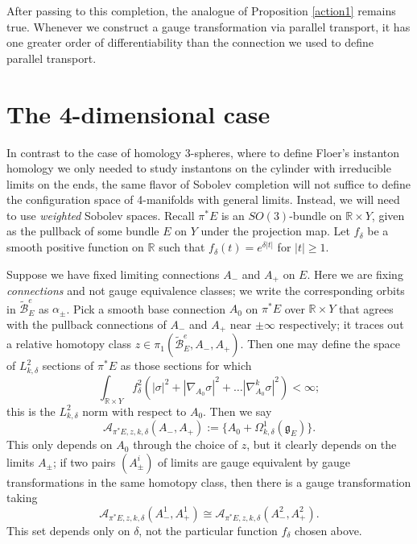 \documentclass[10pt,a4paper]{amsart}
\newcommand{\pE}{\pi^* \! E}
\theoremstyle{definition}
\theoremstyle{remark}
\numberwithin{figure}{qchap}
\begin{document}
After passing to this completion, the analogue of Proposition \ref{action1} remains true. Whenever we construct a gauge transformation via parallel transport, it has one greater order of differentiability than the connection we used to define parallel transport.

\section{The 4-dimensional case}\label{sec:config-Hilbert-4d}
In contrast to the case of homology 3-spheres, where to define Floer's instanton homology we only needed to study instantons on the cylinder with irreducible limits on the ends, the same flavor of Sobolev completion will not suffice to define the configuration space of 4-manifolds with general limits. Instead, we will need to use \textit{weighted} Sobolev spaces. Recall $\pE$ is an $SO(3)$-bundle on $\mathbb R \times Y$, given as the pullback of some bundle $E$ on $Y$ under the projection map. Let $f_\delta$ be a smooth positive function on $\mathbb R$ such that $f_\delta(t) = e^{\delta|t|}$ for $|t| \geq 1$. 

Suppose we have fixed limiting connections $A_-$ and $A_+$ on $E$. Here we are fixing \emph{connections} and not gauge equivalence classes; we write the corresponding orbits in $\widetilde{\mathcal B}^e_E$ as $\alpha_\pm$. Pick a smooth base connection $A_0$ on $\pE$ over $\mathbb R \times Y$ that agrees with the pullback connections of $A_-$ and $A_+$ near $\pm \infty$ respectively; it traces out a relative homotopy class $z \in \pi_1(\widetilde{\mathcal B}^e_E, A_-, A_+)$. Then one may define the space of $L^2_{k,\delta}$ sections of $\pE$ as those sections for which 
$$\int_{\mathbb R \times Y} f_\delta^2\left(|\sigma|^2 + |\nabla_{A_0}\sigma|^2 + \dots |\nabla_{A_0}^k \sigma|^2\right) < \infty;$$ 
this is the $L^2_{k,\delta}$ norm with respect to $A_0$. Then we say $$\mathcal A_{\pE,z,k,\delta}(A_-, A_+) := \{A_0 + \Omega^1_{k,\delta}(\mathfrak g_E)\}.$$ This only depends on $A_0$ through the choice of $z$, but it clearly depends on the limits $A_\pm$; if two pairs $(A_\pm^i)$ of limits are gauge equivalent by gauge transformations in the same homotopy class, then there is a gauge transformation taking 
$$\mathcal A_{\pE,z,k,\delta}(A^1_-, A^1_+) \cong \mathcal A_{\pE,z,k,\delta}(A^2_-, A^2_+).$$ 
This set depends only on $\delta$, not the particular function $f_\delta$ chosen above. 
\end{document}
